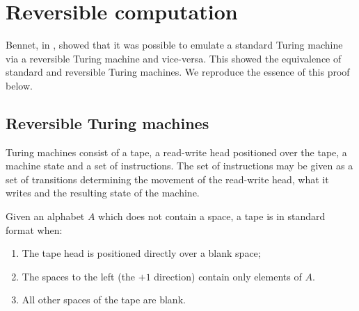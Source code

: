 
\chapter{Reversible computation}\label{chap:reversible_computation}

Bennet, in \cite{bennett:1973reverse}, showed that it was possible to
emulate a standard Turing machine via a reversible Turing machine and
vice-versa. This showed the equivalence of  standard and reversible
Turing machines. We reproduce the essence of this proof below.

\section{Reversible Turing machines} %
\label{sec:reversible_turing_machines}

Turing machines consist of a tape, a read-write head positioned over
the tape, a machine state and a set of instructions. The set of instructions
may be given as a set of transitions determining the movement of the
read-write head, what it writes and the resulting state of the machine.

\begin{definition}\label{def:standard_tape}
  Given an alphabet $A$ which does not contain a space, a tape is in standard
  format when:
  \begin{enumerate}
    \item The tape head is positioned directly over a blank space;
    \item The spaces to the left (the $+1$ direction) contain only
    elements of $A$.
    \item All other spaces of the tape are blank.
  \end{enumerate}
\end{definition}


